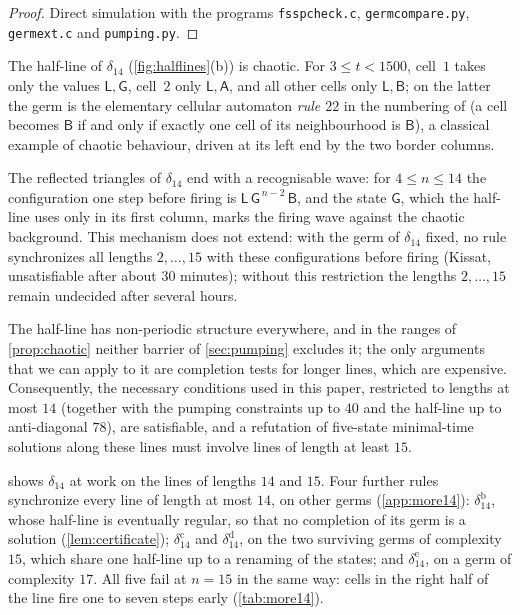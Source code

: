 \begin{proof}
Direct simulation with the programs \texttt{fsspcheck.c},
\texttt{germcompare.py}, \texttt{germext.c} and \texttt{pumping.py}.
\end{proof}

The half-line of $\delta_{14}$ (\cref{fig:halflines}(b)) is chaotic. For
$3\le t<1500$, cell~$1$ takes only the values
$\mathsf L,\mathsf G$, cell~$2$ only $\mathsf L,\mathsf A$, and all other
cells only $\mathsf L,\mathsf B$; on the latter the germ is the elementary
cellular automaton \emph{rule $22$} in the numbering of \cite{Wolfram83}
(a cell becomes $\mathsf B$ if and only if exactly one cell of its
neighbourhood is $\mathsf B$), a classical example of chaotic behaviour,
driven at its left end by the two border columns.

The reflected triangles of $\delta_{14}$ end with a recognisable
wave: for $4\le n\le14$ the configuration one step before firing is
$\mathsf L\,\mathsf G^{\,n-2}\,\mathsf B$, and the state $\mathsf G$, which
the half-line uses only in its first column, marks the firing wave against
the chaotic background. This mechanism does not extend: with the germ of
$\delta_{14}$ fixed, no rule synchronizes all lengths $2,\dots,15$ with
these configurations before firing (Kissat, unsatisfiable after about
$30$ minutes); without this restriction the lengths $2,\dots,15$ remain
undecided after several hours.

The half-line has non-periodic structure everywhere, and in the ranges of \cref{prop:chaotic} neither barrier of
\cref{sec:pumping} excludes it; the only arguments that we can apply to it
are completion tests for longer lines, which are expensive. Consequently, the
necessary conditions used in this paper, restricted to lengths at most $14$
(together with the pumping constraints up to $40$ and the half-line up to
anti-diagonal $78$), are satisfiable, and a refutation of five-state
minimal-time solutions along these lines must involve lines of length at
least $15$.

 shows $\delta_{14}$ at work on the lines of lengths
$14$ and $15$. Four further rules synchronize every line of length at most
$14$, on other germs (\cref{app:more14}): $\delta_{14}^{\mathrm b}$, whose
half-line is eventually regular, so that no completion of its germ is a
solution (\cref{lem:certificate}); $\delta_{14}^{\mathrm c}$ and
$\delta_{14}^{\mathrm d}$, on the two surviving germs of complexity $15$,
which share one half-line up to a renaming of the states; and
$\delta_{14}^{\mathrm e}$, on a germ of complexity $17$. All five fail at
$n=15$ in the same way: cells in the right half of the line fire one to
seven steps early (\cref{tab:more14}).

